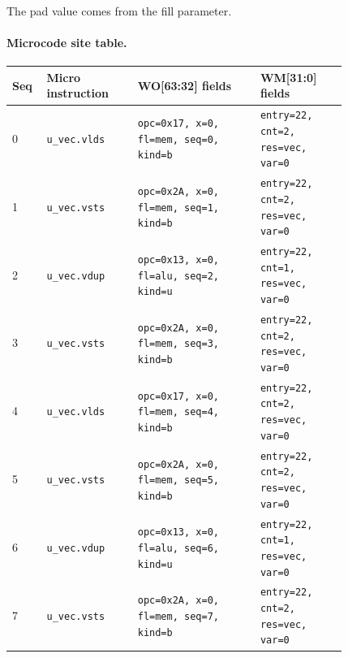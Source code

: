 {\small
The pad value comes from the fill parameter.
\paragraph{Microcode site table.}
{\scriptsize
\begin{longtable}{@{}R{0.055\linewidth}L{0.23\linewidth}L{0.31\linewidth}L{0.22\linewidth}@{}}
\toprule
Seq & Micro instruction & WO[63:32] fields & WM[31:0] fields \\
 & \texttt{u\_vec.vlds} & \texttt{opc=0x17, x=0, fl=mem, seq=0, kind=b} & \texttt{entry=22, cnt=2, res=vec, var=0} \\
1 & \texttt{u\_vec.vsts} & \texttt{opc=0x2A, x=0, fl=mem, seq=1, kind=b} & \texttt{entry=22, cnt=2, res=vec, var=0} \\
2 & \texttt{u\_vec.vdup} & \texttt{opc=0x13, x=0, fl=alu, seq=2, kind=u} & \texttt{entry=22, cnt=1, res=vec, var=0} \\
3 & \texttt{u\_vec.vsts} & \texttt{opc=0x2A, x=0, fl=mem, seq=3, kind=b} & \texttt{entry=22, cnt=2, res=vec, var=0} \\
4 & \texttt{u\_vec.vlds} & \texttt{opc=0x17, x=0, fl=mem, seq=4, kind=b} & \texttt{entry=22, cnt=2, res=vec, var=0} \\
5 & \texttt{u\_vec.vsts} & \texttt{opc=0x2A, x=0, fl=mem, seq=5, kind=b} & \texttt{entry=22, cnt=2, res=vec, var=0} \\
6 & \texttt{u\_vec.vdup} & \texttt{opc=0x13, x=0, fl=alu, seq=6, kind=u} & \texttt{entry=22, cnt=1, res=vec, var=0} \\
7 & \texttt{u\_vec.vsts} & \texttt{opc=0x2A, x=0, fl=mem, seq=7, kind=b} & \texttt{entry=22, cnt=2, res=vec, var=0} \\
\bottomrule
\end{longtable}
}
}
